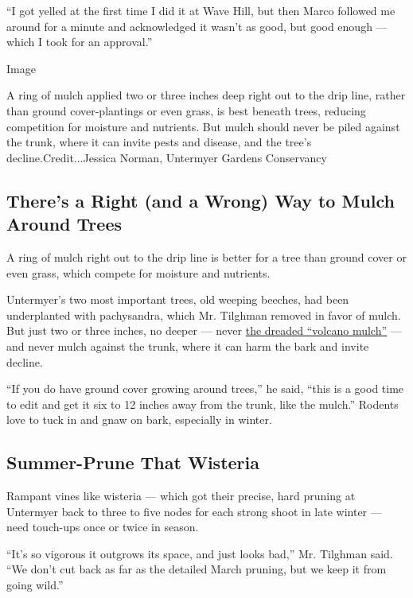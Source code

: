 ``I got yelled at the first time I did it at Wave Hill, but then Marco
followed me around for a minute and acknowledged it wasn't as good, but
good enough --- which I took for an approval.''

Image

A ring of mulch applied two or three inches deep right out to the drip
line, rather than ground cover-plantings or even grass, is best beneath
trees, reducing competition for moisture and nutrients. But mulch should
never be piled against the trunk, where it can invite pests and disease,
and the tree's decline.Credit...Jessica Norman, Untermyer Gardens
Conservancy

\hypertarget{theres-a-right-and-a-wrong-way-to-mulch-around-trees}{%
\subsection{There's a Right (and a Wrong) Way to Mulch Around
Trees}\label{theres-a-right-and-a-wrong-way-to-mulch-around-trees}}

A ring of mulch right out to the drip line is better for a tree than
ground cover or even grass, which compete for moisture and nutrients.

Untermyer's two most important trees, old weeping beeches, had been
underplanted with pachysandra, which Mr. Tilghman removed in favor of
mulch. But just two or three inches, no deeper --- never
\href{https://bygl.osu.edu/node/1006}{the dreaded ``volcano mulch''} ---
and never mulch against the trunk, where it can harm the bark and invite
decline.

``If you do have ground cover growing around trees,'' he said, ``this is
a good time to edit and get it six to 12 inches away from the trunk,
like the mulch.'' Rodents love to tuck in and gnaw on bark, especially
in winter.

\hypertarget{summer-prune-that-wisteria}{%
\subsection{Summer-Prune That
Wisteria}\label{summer-prune-that-wisteria}}

Rampant vines like wisteria --- which got their precise, hard pruning at
Untermyer back to three to five nodes for each strong shoot in late
winter --- need touch-ups once or twice in season.

``It's so vigorous it outgrows its space, and just looks bad,'' Mr.
Tilghman said. ``We don't cut back as far as the detailed March pruning,
but we keep it from going wild.''

